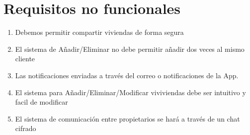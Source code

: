 \section{Requisitos no funcionales}
\begin{enumerate}
\item Debemos permitir compartir viviendas de forma segura 
\item El sistema de Añadir/Eliminar no debe permitir añadir dos veces al mismo cliente
\item Las notificaciones enviadas a través del correo o notificaciones de la App.
\item El sistema para Añadir/Eliminar/Modificar viviviendas debe ser intuitivo y facil de modificar
\item El sistema de comunicación entre propietarios se hará a través de un chat cifrado
\end{enumerate}
